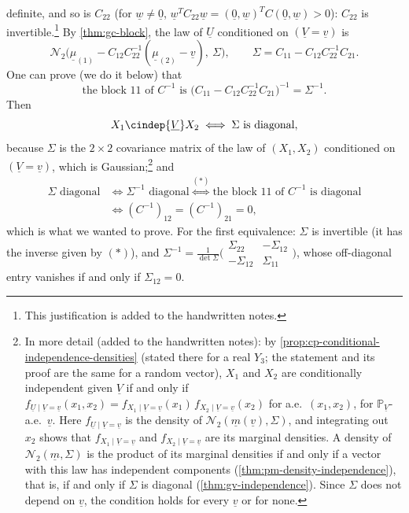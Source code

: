 \begin{example}
definite, and so is $C_{22}$ (for $\underline w\ne\underline 0$, $\underline w^TC_{22}\underline w=(\underline 0,\underline w)^TC(\underline 0,\underline w)>0$): $C_{22}$ is
invertible.\footnote{This justification is added to the handwritten notes.} By \cref{thm:gc-block},
the law of $\underline U$ conditioned on $(\underline V=\underline v)$ is
\[
  \mathcal N_2\big(\underline\mu_{(1)}-C_{12}C_{22}^{-1}(\underline\mu_{(2)}-\underline v),\ \Sigma\big),\qquad\Sigma=C_{11}-C_{12}C_{22}^{-1}C_{21}.
\]
One can prove (we do it below) that
\begin{equation}\label{eq:gc-star}
  \text{the block $11$ of $C^{-1}$ is }\big(C_{11}-C_{12}C_{22}^{-1}C_{21}\big)^{-1}=\Sigma^{-1}.\tag{$*$}
\end{equation}
Then
\[
  X_1\cindep{\underline V}X_2\iff\Sigma\text{ is diagonal},
\]
because $\Sigma$ is the $2\times2$ covariance matrix of the law of $(X_1,X_2)$ conditioned on
$(\underline V=\underline v)$, which is Gaussian;\footnote{In more detail (added to the handwritten notes): by
\cref{prop:cp-conditional-independence-densities} (stated there for a real $Y_3$; the statement and
its proof are the same for a random vector), $X_1$ and $X_2$ are conditionally independent given
$\underline V$ if and only if
$f_{\underline U\mid\underline V=\underline v}(x_1,x_2)=f_{X_1\mid\underline V=\underline v}(x_1)\,f_{X_2\mid\underline V=\underline v}(x_2)$
for a.e.\ $(x_1,x_2)$, for $\mathbb P_{\underline V}$-a.e.\ $\underline v$. Here
$f_{\underline U\mid\underline V=\underline v}$ is the density of $\mathcal N_2(\underline m(\underline v),\Sigma)$,
and integrating out $x_2$ shows that $f_{X_1\mid\underline V=\underline v}$ and
$f_{X_2\mid\underline V=\underline v}$ are its marginal
densities. A density of $\mathcal N_2(\underline m,\Sigma)$ is the product of its marginal densities if and only
if a vector with this law has independent components (\cref{thm:pm-density-independence}), that is,
if and only if $\Sigma$ is diagonal (\cref{thm:gv-independence}). Since $\Sigma$ does not depend on
$\underline v$, the condition holds for every $\underline v$ or for none.} and
\[
\begin{aligned}
  \Sigma\text{ diagonal}&\iff\Sigma^{-1}\text{ diagonal}\overset{(*)}{\iff}\text{the block $11$ of $C^{-1}$ is diagonal}\\
  &\iff(C^{-1})_{12}=(C^{-1})_{21}=0,
\end{aligned}
\]
which is what we wanted to prove. For the first equivalence: $\Sigma$ is invertible (it has the
inverse given by $(*)$), and
$\Sigma^{-1}=\frac1{\det\Sigma}\big(\begin{smallmatrix}\Sigma_{22}&-\Sigma_{12}\\-\Sigma_{12}&\Sigma_{11}\end{smallmatrix}\big)$,
whose off-diagonal entry vanishes if and only if $\Sigma_{12}=0$.


\end{example}
